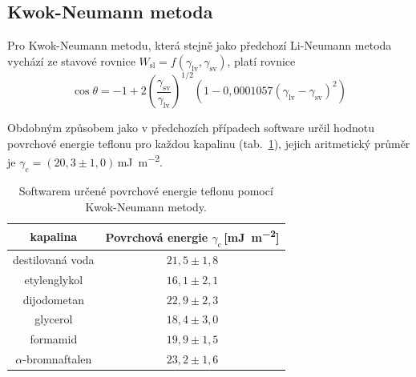 \documentclass{protokol}
\begin{document}
\subsection{Kwok-Neumann metoda}
\par Pro Kwok-Neumann metodu, která stejně jako předchozí Li-Neumann metoda vychází ze stavové rovnice $W_\text{sl}=f(\gamma_{\text{lv}},\gamma_{\text{sv}})$, platí rovnice
\begin{equation}
	\cos\theta = -1 + 
	2 {\left(\frac{\gamma_{\text{sv}}}{\gamma_{\text{lv}}}\right)}^{1/2} 
	\left(1-0,0001057(\gamma_{\text{lv}} - \gamma_{\text{sv}})^2\right)
\end{equation}

Obdobným způsobem jako v předchozích případech software určil hodnotu povrchové 
energie teflonu pro každou kapalinu (tab.~\ref{table:KwokNeumann}), jejich 
aritmetický průměr je 
$\gamma_{\text{c}} = (20,3\pm1,0)$\,\si{\milli\joule\per\meter\squared}.

\begin{table}[h]
	\caption{Softwarem určené povrchové energie teflonu pomocí Kwok-Neumann 
	metody.}
	\label{table:KwokNeumann}
	\begin{tabular}{|c|c|}\hline
		kapalina  & Povrchová energie 
		$\gamma_{\text{c}}$\,[\si{\milli\joule\per\meter\squared}] \\ \hline
		destilovaná voda & $21,5 \pm 1,8$     \\
		etylenglykol     & $16,1 \pm 2,1$     \\
		dijodometan      & $22,9 \pm 2,3$     \\
		glycerol         & $18,4 \pm 3,0$     \\
		formamid         & $19,9 \pm 1,5$     \\
		$\alpha$-bromnaftalen & $23,2 \pm 1,6$\\ \hline
	\end{tabular}
\end{table}
\end{document}
